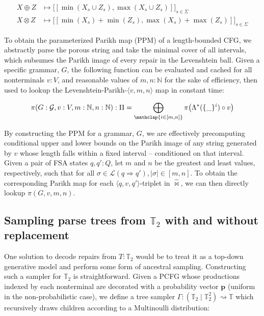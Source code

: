 \documentclass[runningheads]{llncs}
\begin{document}
  \begin{align}
      X \oplus Z &\mapsto \big[[\min(X_s \cup Z_s), \max(X_s \cup Z_s)]\big]_{s \in \Sigma}\\ X \otimes Z &\mapsto \big[[\min(X_s) + \min(Z_s), \max(X_s) + \max(Z_s)]\big]_{s \in \Sigma}
  \end{align}

  To obtain the parameterized Parikh map (PPM) of a length-bounded CFG, we abstractly parse the porous string and take the minimal cover of all intervals, which subsumes the Parikh image of every repair in the Levenshtein ball. Given a specific grammar, $G$, the following function can be evaluated and cached for all nonterminals $v: V$, and reasonable values of $m, n: \mathbb{N}$ for the sake of efficiency, then used to lookup the Levenshtein-Parikh-$\langle v, m, n\rangle $ map in constant time:

  \begin{equation}
  \pi(G: \mathcal{G}, v: V, m: \mathbb{N}, n: \mathbb{N}): \Pi = \bigoplus_{\mathclap{i\in [m, n]}}\pi\bigl(\Lambda^*(\{\_\}^i)\circ v\bigr)
  \end{equation}

  By constructing the PPM for a grammar, $G$, we are effectively precomputing conditional upper and lower bounds on the Parikh image of any string generated by $v$ whose length falls within a fixed interval -- conditioned on that interval. Given a pair of FSA states $q, q': Q$, let $m$ and $n$ be the greatest and least values, respectively, such that for all $\sigma \in \mathcal{L}(q \Longrightarrow q'), |\sigma|\in[m, n]$. To obtain the corresponding Parikh map for each $\langle q, v, q'\rangle$-triplet in $\hat\Join$, we can then directly lookup $\pi(G, v, m, n)$.

\subsection{Sampling parse trees from $\mathbb{T}_2$ with and without replacement}\label{sec:tree_sampling}

  One solution to decode repairs from $T: \mathbb{T}_2$ would be to treat it as a top-down generative model and perform some form of ancestral sampling. Constructing such a sampler for $\mathbb{T}_2$ is straightforward. Given a PCFG whose productions indexed by each nonterminal are decorated with a probability vector $\mathbf{p}$ (uniform in the non-probabilistic case), we define a tree sampler $\Gamma: (\mathbb{T}_2 \mid \mathbb{T}_2^2) \rightsquigarrow \mathbb{T}$ which recursively draws children according to a Multinoulli distribution:
\end{document}
